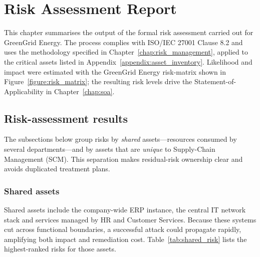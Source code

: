\chapter{Risk Assessment Report}
\label{chap:risk_assessment_report}

This chapter summarises the output of the formal risk assessment carried out for GreenGrid Energy.  
The process complies with ISO/IEC 27001 Clause 8.2 and uses the methodology specified in Chapter~\ref{chap:risk_management}, applied to the critical assets listed in Appendix~\ref{appendix:asset_inventory}.  
Likelihood and impact were estimated with the GreenGrid Energy risk-matrix shown in Figure~\ref{figure:risk_matrix}; the resulting risk levels drive the Statement-of-Applicability in Chapter~\ref{chap:soa}.

\section{Risk-assessment results}

The subsections below group risks by \emph{shared} assets—resources consumed by several departments—and by assets that are \emph{unique} to Supply-Chain Management (SCM).  
This separation makes residual-risk ownership clear and avoids duplicated treatment plans.

\subsection{Shared assets}

Shared assets include the company-wide ERP instance, the central IT network stack and services managed by HR and Customer Services.  
Because these systems cut across functional boundaries, a successful attack could propagate rapidly, amplifying both impact and remediation cost.  
Table~\ref{tab:shared_risk} lists the highest-ranked risks for those assets.

